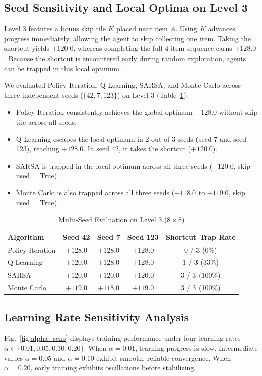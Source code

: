 \documentclass[10pt,conference]{IEEEtran}
\begin{document}
\subsection{Seed Sensitivity and Local Optima on Level 3}
Level 3 features a bonus skip tile $K$ placed near item $A$. Using $K$ advances progress immediately, allowing the agent to skip collecting one item. Taking the shortcut yields $+120.0$, whereas completing the full 4-item sequence earns $+128.0$. Because the shortcut is encountered early during random exploration, agents can be trapped in this local optimum.

We evaluated Policy Iteration, Q-Learning, SARSA, and Monte Carlo across three independent seeds ($\{42, 7, 123\}$) on Level 3 (Table~\ref{tab:seed_exp}):
\begin{itemize}
    \item Policy Iteration consistently achieves the global optimum $+128.0$ without skip tile across all seeds.
    \item Q-Learning escapes the local optimum in 2 out of 3 seeds (seed 7 and seed 123), reaching $+128.0$. In seed 42, it takes the shortcut ($+120.0$).
    \item SARSA is trapped in the local optimum across all three seeds ($+120.0$, skip used = True).
    \item Monte Carlo is also trapped across all three seeds ($+118.0$ to $+119.0$, skip used = True).
\end{itemize}

\begin{table}[htbp]
\caption{Multi-Seed Evaluation on Level 3 ($8\times 8$)}
\label{tab:seed_exp}
\centering
\begin{tabular}{lcccc}
\toprule
\textbf{Algorithm} & \textbf{Seed 42} & \textbf{Seed 7} & \textbf{Seed 123} & \textbf{Shortcut Trap Rate} \\
\midrule
Policy Iteration & $+128.0$ & $+128.0$ & $+128.0$ & 0 / 3 (0\%) \\
Q-Learning       & $+120.0$ & $+128.0$ & $+128.0$ & 1 / 3 (33\%) \\
SARSA            & $+120.0$ & $+120.0$ & $+120.0$ & 3 / 3 (100\%) \\
Monte Carlo      & $+119.0$ & $+118.0$ & $+119.0$ & 3 / 3 (100\%) \\
\bottomrule
\end{tabular}
\end{table}

\subsection{Learning Rate Sensitivity Analysis}
Fig.~\ref{fig:alpha_sens} displays training performance under four learning rates $\alpha \in \{0.01, 0.05, 0.10, 0.20\}$. When $\alpha = 0.01$, learning progress is slow. Intermediate values $\alpha = 0.05$ and $\alpha = 0.10$ exhibit smooth, reliable convergence. When $\alpha = 0.20$, early training exhibits oscillations before stabilizing.
\end{document}
